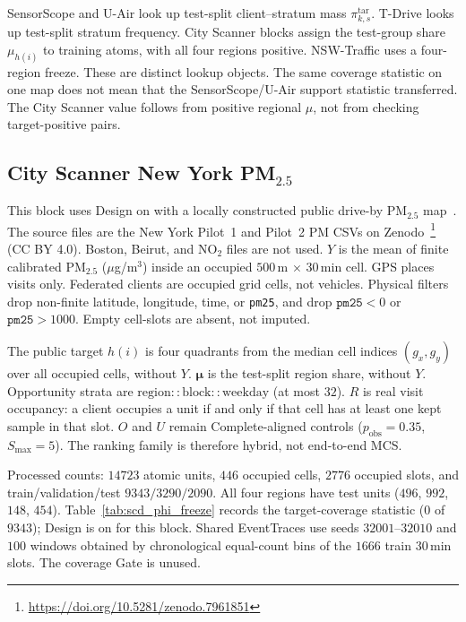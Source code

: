 SensorScope and U-Air look up test-split client--stratum mass
$\pi^{\mathrm{tar}}_{k,s}$.  T-Drive looks up test-split stratum
frequency.  City Scanner blocks assign the test-group share $\mu_{h(i)}$
to training atoms, with all four regions positive.  NSW-Traffic uses a
four-region freeze.  These are distinct lookup objects.  The same
coverage statistic on one map does not mean that the SensorScope/U-Air
support statistic transferred.  The City Scanner value follows from
positive regional $\mu$, not from checking target-positive pairs.

\subsection{City Scanner New York {PM}$_{2.5}$}
\label{app:cityscanner_nyc}

This block uses Design on with a locally constructed
public drive-by
{PM}$_{2.5}$ map~\cite{wang2023cityscanner}.
The source files are the New York Pilot~1 and Pilot~2 {PM} CSVs on
Zenodo~\footnote{\url{https://doi.org/10.5281/zenodo.7961851}}
({CC BY} 4.0).  Boston, Beirut, and {NO}$_2$ files are not used.
$Y$ is the mean of finite calibrated {PM}$_{2.5}$ ($\mu$g/m$^3$) inside
an occupied $500$\,m $\times$ $30$\,min cell.
GPS places visits only.
Federated clients are occupied grid cells, not vehicles.
Physical filters drop non-finite latitude, longitude, time, or
\texttt{pm25}, and drop $\texttt{pm25}<0$ or $\texttt{pm25}>1000$.
Empty cell-slots are absent, not imputed.

The public target $h(i)$ is four quadrants from the median cell indices
$(g_x,g_y)$ over all occupied cells, without $Y$.
$\boldsymbol\mu$ is the test-split region share, without $Y$.
Opportunity strata are $\mathrm{region}{::}\mathrm{block}{::}\mathrm{weekday}$
(at most $32$).
$R$ is real visit occupancy: a client occupies a unit if and only if
that cell has at least one kept sample in that slot.
$O$ and $U$ remain Complete-aligned controls
($p_{\mathrm{obs}}=0.35$, $S_{\max}=5$).
The ranking family is therefore hybrid, not end-to-end MCS.

Processed counts: $14723$ atomic units, $446$ occupied cells, $2776$
occupied slots, and train/validation/test $9343/3290/2090$.
All four regions have test units
($496$, $992$, $148$, $454$).
Table~\ref{tab:scd_phi_freeze} records the target-coverage statistic
($0$ of $9343$); Design is on for this block.
Shared EventTraces use seeds $32001$--$32010$ and $100$ windows obtained
by chronological equal-count bins of the $1666$ train $30$\,min slots.
The coverage Gate is unused.

